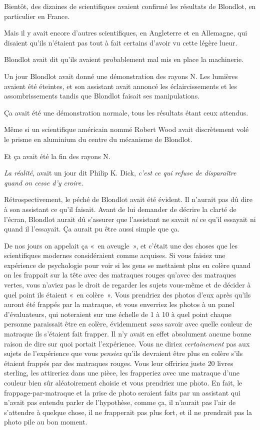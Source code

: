 Bientôt, des dizaines de scientifiques avaient confirmé les résultats de Blondlot, en particulier en France.

Mais il y avait encore d'autres scientifiques, en Angleterre et en Allemagne, qui disaient qu'ils n'étaient pas tout à fait certains d'avoir vu cette légère lueur.

Blondlot avait dit qu'ils avaient probablement mal mis en place la machinerie.

Un jour Blondlot avait donné une démonstration des rayons N. Les lumières avaient été éteintes, et son assistant avait annoncé les éclaircissements et les assombrissements tandis que Blondlot faisait ses manipulations.

Ça avait été une démonstration normale, tous les résultats étant ceux attendus.

Même si un scientifique américain nommé Robert Wood avait discrètement volé le prisme en aluminium du centre du mécanisme de Blondlot.

Et ça avait été la fin des rayons N.

\emph{La réalité}, avait un jour dit Philip K. Dick, \emph{c'est ce qui refuse de disparaître quand on cesse d'y croire.}

Rétrospectivement, le péché de Blondlot avait été évident. Il n'aurait pas dû dire à son assistant ce qu'il faisait. Avant de lui demander de décrire la clarté de l'écran, Blondlot aurait dû s'assurer que l'assistant ne savait \emph{ni} ce qu'il essayait ni quand il l'essayait. Ça aurait pu être aussi simple que ça.

De nos jours on appelait ça «~en aveugle~», et c'était une des choses que les scientifiques modernes considéraient comme acquises. Si vous faisiez une expérience de psychologie pour voir si les gens se mettaient plus en colère quand on les frappait sur la tête avec des matraques rouges qu'avec des matraques vertes, vous n'aviez pas le droit de regarder les sujets vous-même et de décider à quel point ils étaient «~en colère~». Vous prendriez des photos d'eux après qu'ils auront été frappés par la matraque, et vous enverriez les photos à un panel d'évaluateurs, qui noteraient sur une échelle de 1 à 10 à quel point chaque personne paraissait être en colère, évidemment \emph{sans} savoir avec quelle couleur de matraque ils s'étaient fait frapper. Il n'y avait en effet absolument aucune bonne raison de dire sur quoi portait l'expérience. Vous ne diriez \emph{certainement} pas aux sujets de l'expérience que vous \emph{pensiez} qu'ils devraient être plus en colère s'ils étaient frappés par des matraques rouges. Vous leur offririez juste 20 livres sterling, les attireriez dans une pièce, les frapperiez avec une matraque d'une couleur bien sûr aléatoirement choisie et vous prendriez une photo. En fait, le frappage-par-matraque et la prise de photo seraient faits par un assistant qui n'avait pas entendu parler de l'hypothèse, comme ça, il n'aurait pas l'air de s'attendre à quelque chose, il ne frapperait pas plus fort, et il ne prendrait pas la photo pile au bon moment.

